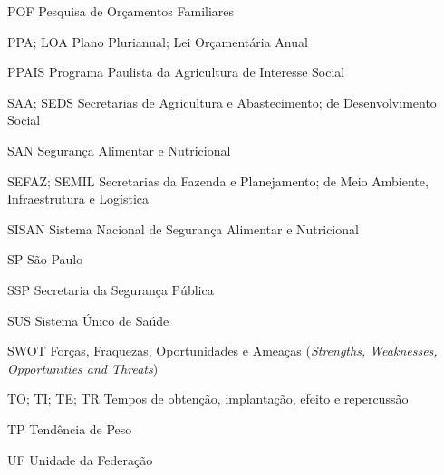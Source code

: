\documentclass[
	12pt,				%
	openright,			%
	oneside,			%
	a4paper,			%
	chapter=TITLE,		%
	section=TITLE,		%
	english,			%
	french,				%
	spanish,			%
	brazil,				%
 ]{abntex2}
\begin{document}
\begin{siglas}
	\item[POF] Pesquisa de Orçamentos Familiares
	\item[PPA; LOA] Plano Plurianual; Lei Orçamentária Anual
	\item[PPAIS] Programa Paulista da Agricultura de Interesse Social
	\item[SAA; SEDS] Secretarias de Agricultura e Abastecimento; de Desenvolvimento Social
	\item[SAN] Segurança Alimentar e Nutricional
	\item[SEFAZ; SEMIL] Secretarias da Fazenda e Planejamento; de Meio Ambiente, Infraestrutura e Logística
	\item[SISAN] Sistema Nacional de Segurança Alimentar e Nutricional
	\item[SP] São Paulo
	\item[SSP] Secretaria da Segurança Pública
	\item[SUS] Sistema Único de Saúde
	\item[SWOT] Forças, Fraquezas, Oportunidades e Ameaças (\textit{Strengths, Weaknesses, Opportunities and Threats})
	\item[TO; TI; TE; TR] Tempos de obtenção, implantação, efeito e repercussão
	\item[TP] Tendência de Peso
	\item[UF] Unidade da Federação
\end{siglas}
\end{document}
